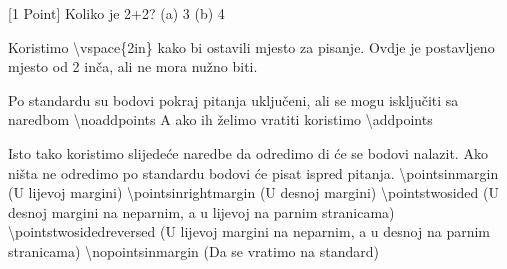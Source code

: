 \documentclass[addpoints,answers]{beamer}
\newcounter{points}
\newenvironment{questions}{\setcounter{points}{0}}{}
\newcommand{\question}[1][1]{\addtocounter{points}{#1}}
\begin{document}
\begin{frame}
\begin{questions} 
\question[1]
[1 Point] Koliko je 2+2?\newline
(a) 3 \newline
(b)	4 
\end{questions}
\end{frame}


\begin{frame}
Koristimo
\newline
\newline
\color{blue}
\textbackslash{vspace\{2in\}} 
\color{black}
\newline
\newline
kako bi ostavili mjesto za pisanje. Ovdje je postavljeno mjesto od 2 inča, ali ne mora nužno biti.
\end{frame}

\begin{frame}
Po standardu su bodovi pokraj pitanja uključeni, ali se mogu isključiti sa naredbom
\newline
\newline
\color{blue}
\textbackslash{noaddpoints}
\color{black}
\newline
\newline
A ako ih želimo vratiti koristimo 
\newline
\newline
\color{blue}
\textbackslash{addpoints}
\color{black}
\end{frame}

\begin{frame}
Isto tako koristimo slijedeće naredbe da odredimo di će se bodovi nalazit. Ako ništa ne odredimo po standardu bodovi će pisat ispred pitanja.
\newline
\newline
\color{blue}
\textbackslash{pointsinmargin}
\color{black}
(U lijevoj margini)
\color{blue}
\newline
\newline
\textbackslash{pointsinrightmargin}
\color{black}
(U desnoj margini)
\color{blue}
\newline
\newline
\textbackslash{pointstwosided}
\color{black}
(U desnoj margini na neparnim, a u lijevoj na parnim stranicama)
\color{blue}
\newline
\newline
\textbackslash{pointstwosidedreversed}
\color{black}
(U lijevoj margini na neparnim, a u desnoj na parnim stranicama)
\color{blue}
\newline
\newline
\textbackslash{nopointsinmargin}\color{black}   (Da se vratimo na standard)
\end{frame}
\end{document}
